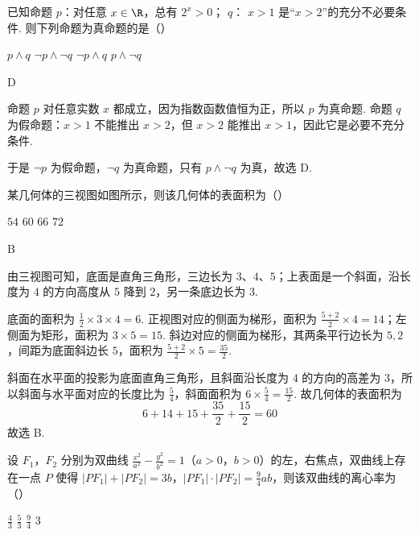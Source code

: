\begin{problem}
已知命题 \(p\)：对任意 \(x \in \R\)，总有 \(2^x > 0\)； \(q\)： \(x > 1\) 是“\(x > 2\)”的充分不必要条件. 则下列命题为真命题的是（\quad）

\choices
    {\(p \wedge q\)}
    {\(\neg p \land \neg q\)}
    {\(\neg p \land q\)}
    {\(p \wedge \neg q\)}
\end{problem}

\begin{answer}
D
\end{answer}

\begin{solution}
命题 \(p\) 对任意实数 \(x\) 都成立，因为指数函数值恒为正，所以 \(p\) 为真命题. 命题 \(q\) 为假命题：\(x>1\) 不能推出 \(x>2\)，但 \(x>2\) 能推出 \(x>1\)，因此它是必要不充分条件.

于是 \(\neg p\) 为假命题，\(\neg q\) 为真命题，只有 \(p\wedge\neg q\) 为真，故选 D.
\end{solution}

\begin{problem}
某几何体的三视图如图所示，则该几何体的表面积为（\quad）


\choices
    {\(54\)}
    {\(60\)}
    {\(66\)}
    {\(72\)}
\end{problem}

\begin{answer}
B
\end{answer}

\begin{solution}
由三视图可知，底面是直角三角形，三边长为 \(3\)、\(4\)、\(5\)；上表面是一个斜面，沿长度为 \(4\) 的方向高度从 \(5\) 降到 \(2\)，另一条底边长为 \(3\).

底面的面积为 \(\frac{1}{2}\times3\times4=6\). 正视图对应的侧面为梯形，面积为 \(\frac{5+2}{2}\times4=14\)；左侧面为矩形，面积为 \(3\times5=15\). 斜边对应的侧面为梯形，其两条平行边长为 \(5,2\)，间距为底面斜边长 \(5\)，面积为 \(\frac{5+2}{2}\times5=\frac{35}{2}\).

斜面在水平面的投影为底面直角三角形，且斜面沿长度为 \(4\) 的方向的高差为 \(3\)，所以斜面与水平面对应的长度比为 \(\frac{5}{4}\)，斜面面积为 \(6\times\frac{5}{4}=\frac{15}{2}\). 故几何体的表面积为
\[
6+14+15+\frac{35}{2}+\frac{15}{2}=60
\]
故选 B.
\end{solution}

\begin{problem}
设 \(F_{1}\)，\(F_{2}\) 分别为双曲线 \(\frac{x^{2}}{a^{2}} - \frac{y^{2}}{b^{2}} = 1\)（\(a > 0\)，\(b > 0\)）的左，右焦点，双曲线上存在一点 \(P\) 使得 \(\left|PF_{1}\right| + \left|PF_{2}\right| = 3b\)，\(\left|PF_{1}\right| \cdot \left|PF_{2}\right| = \frac{9}{4} ab\)，则该双曲线的离心率为（\quad）

\choices
    {\( \frac{4}{3} \)}
    {\( \frac{5}{3} \)}
    {\( \frac{9}{4} \)}
    {3}
\end{problem}

